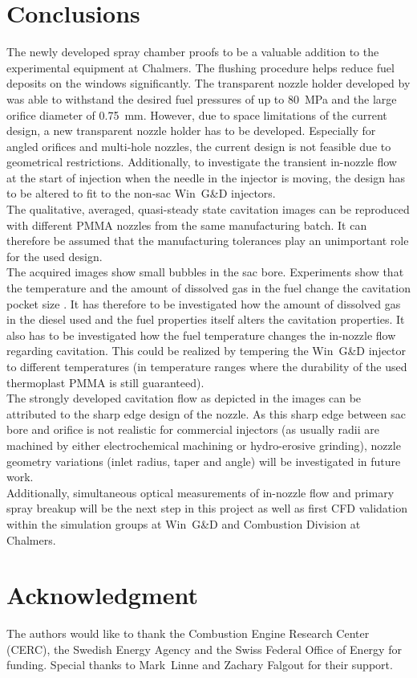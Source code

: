 \documentclass[letterpaper,twocolumn,10pt]{ilass}
\begin{document}
\section*{Conclusions}
The newly developed spray chamber proofs to be a valuable addition to the experimental equipment
at Chalmers. The flushing procedure helps reduce fuel deposits on the windows significantly.
The transparent nozzle holder developed by \cite{Falgout2015} was able to withstand the desired
fuel pressures of up to 80~MPa and the large orifice diameter of 0.75~mm. However, due to space
limitations of the current design, a new transparent nozzle holder has to be developed.
Especially for angled orifices and multi-hole nozzles, the current design is not feasible due
to geometrical restrictions. Additionally, to investigate the transient in-nozzle flow at the
start of injection when the needle in the injector is moving, the design has to be altered to
fit to the non-sac Win~G\&D injectors.\\
%
The qualitative, averaged, quasi-steady state cavitation images can be reproduced with different
PMMA nozzles from the same manufacturing batch. It can therefore be assumed that the
manufacturing tolerances play an unimportant role for the used design.\\
%
The acquired images show small bubbles in the sac bore. Experiments show that the temperature
and the amount of dissolved gas in the fuel change the cavitation pocket size
\cite{Watanabe2014}.
It has therefore to be investigated how the amount of dissolved gas in the diesel used and
the fuel properties itself alters the cavitation properties. It also has to be investigated
how the fuel temperature changes the in-nozzle flow regarding cavitation. This could be realized
by tempering the Win~G\&D injector to different temperatures (in temperature ranges where the
durability of the used thermoplast PMMA is still guaranteed).\\
%
The strongly developed cavitation flow as depicted in the images can be attributed to the
sharp edge design of the nozzle. As this sharp edge between sac bore and orifice is not
realistic for commercial injectors (as usually radii are machined by either electrochemical
machining or hydro-erosive grinding), nozzle geometry variations (inlet radius, taper and angle)
will be investigated in future work.\\
%
Additionally, simultaneous optical measurements of in-nozzle flow and primary spray breakup
will be the next step in this project as well as first CFD validation within the simulation
groups at Win~G\&D and Combustion Division at Chalmers.\\
%



\section*{Acknowledgment}
The authors would like to thank the Combustion Engine Research Center (CERC),
the Swedish Energy Agency and the Swiss Federal Office of Energy for funding.
Special thanks to Mark~Linne and Zachary Falgout for their support.
\newline



\end{document}
